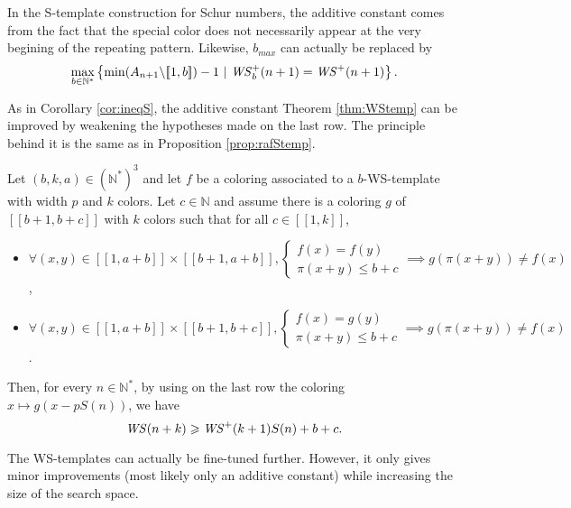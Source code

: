 \begin{remark}
In the S-template construction for Schur numbers, the additive constant comes from the fact that the special color does
not necessarily appear at the very begining of the repeating pattern. Likewise, \(b_{max}\) can actually be replaced by
\[
\max_{b \in \mathbb{N}^*} \left\{\min (A_{n+1} \backslash [\![1, b ]\!]) - 1~|~ \mathit{WS}_b^+(n+1) = \mathit{WS}^+(n+1) \right\}.
\]
\end{remark}

As in Corollary \ref{cor:ineqS}, the additive constant Theorem \ref{thm:WStemp} can be improved 
by weakening the hypotheses made on the last row. The principle behind it is the same as in Proposition \ref{prop:rafStemp}.

\begin{proposition}
\label{prop:tunelastrow}
Let \((b, k, a) \in (\mathbb{N}^*)^3\) and let \(f\) be a coloring associated to a \(b\)-WS-template with width \(p\) and \(k\) colors. Let
\(c \in \mathbb{N}\) and assume there is a coloring \(g\) of \([\![b + 1, b + c]\!]\) with \(k\) colors such that for all \(c \in [\![1, k]\!]\),

\begin{itemize}
\item \(\forall (x, y) \in  [\![1, a + b]\!] \times  [\![b + 1, a + b]\!],  \left\{
	\begin{array}{l}
		f(x) = f(y) \\
		\pi(x + y) \leqslant b + c
	\end{array}
	\right. \implies g(\pi(x + y)) \neq f(x)\),
\item \(\forall (x, y) \in  [\![1, a + b]\!] \times  [\![b + 1, b + c]\!], \left\{
	\begin{array}{l}
		f(x) = g(y) \\
		\pi(x + y) \leqslant b + c
	\end{array}
	\right. \implies g(\pi(x + y)) \neq f(x)\).
\end{itemize}

Then, for every \(n \in \mathbb{N}^*\), by using on the last row the coloring \(x \longmapsto g(x - p S(n))\), we have\\
\[ \mathit{WS}(n+k) \geqslant \mathit{WS}^+(k+1) S(n) + b + c.\]
\end{proposition}

The WS-templates can actually be fine-tuned further. However, it only gives minor improvements (most likely only an 
additive constant) while increasing the size of the search space. 

